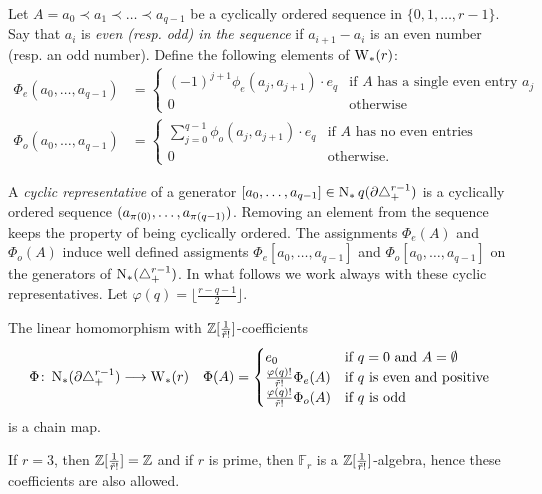 Let $A= a_0\prec a_1\prec\dots\prec a_{q-1}$ be a cyclically ordered sequence in $\{0,1,\dots,r-1\}$. Say that $a_i$ is \emph{even (resp. \emph{odd}) in the sequence} if $a_{i+1}-a_i$ is an even number (resp. an odd number).
Define the following elements of $\operatorname{W}_{*}(r)$:
\begin{align*}
	\Phi_e(a_0,\dots,a_{q-1}) &= \begin{cases}
		(-1)^{j+1}\phi_e(a_j,a_{j+1})\cdot e_q & \text{if $A$ has a single even entry $a_j$} \\
		0 & \text{otherwise}
	\end{cases}
	\\
	\Phi_o(a_0,\dots,a_{q-1}) &= \begin{cases}
		\sum_{j=0}^{q-1} \phi_o(a_j,a_{j+1})\cdot e_q & \text{if $A$ has no even entries} \\
		0 & \text{otherwise.}
	\end{cases}
\end{align*}

A \emph{cyclic representative} of a generator $[a_0,\dots,a_{q-1}]\in \operatorname{N}_{*}{q}(\partial \triangle_{+}^{r-1})$ is a cyclically ordered sequence $(a_{\pi(0)},\dots,a_{\pi(q-1)})$. Removing an element from the sequence keeps the property of being cyclically ordered. The assignments $\Phi_e(A)$ and $\Phi_o(A)$ induce well defined assigments $\Phi_e[a_0,\dots,a_{q-1}]$ and $\Phi_o[a_0,\dots,a_{q-1}]$ on the generators of $\operatorname{N}_{*}(\triangle_{+}^{r-1})$. In what follows we work always with these cyclic representatives. Let $\varphi(q) = \lfloor\frac{r-q-1}{2}\rfloor$.
\begin{theorem} The linear homomorphism with $\mathbb{Z}[\frac{1}{\tilde{r}!}]$-coefficients
	\begin{align*}
		\Phi \colon \operatorname{N}_{*}(\partial \triangle_{+}^{r-1})& \longrightarrow \operatorname{W}_{*}(r)
		&
		\Phi(A) = \begin{cases}
			e_0 & \text{if $q=0$ and $A = \emptyset$}\\
			\frac{\varphi(q)!}{\tilde{r}!}\Phi_e(A) & \text{if $q$ is even and positive} \\
			\frac{\varphi(q)!}{\tilde{r}!}\Phi_o(A) & \text{if $q$ is odd}
		\end{cases}
	\end{align*}
	is a chain map.
\end{theorem}

\begin{remark}
	If $r=3$, then $\mathbb{Z}[\frac{1}{\tilde{r}!}] = \mathbb{Z}$ and if $r$ is prime, then $\mathbb{F}_r$ is a $\mathbb{Z}[\frac{1}{\tilde{r}!}]$-algebra, hence these coefficients are also allowed.
\end{remark}

